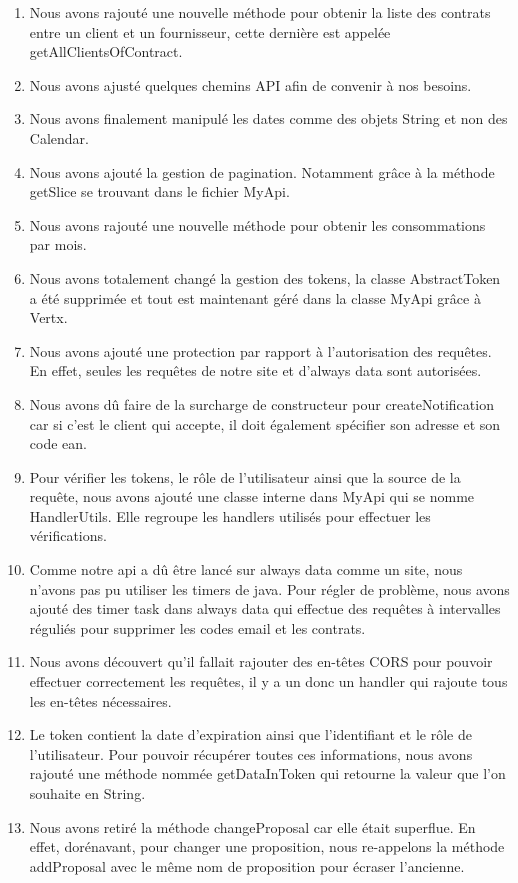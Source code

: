 \begin{enumerate}
\item Nous avons rajouté une nouvelle méthode pour obtenir la liste des contrats entre un client et un fournisseur, cette dernière est appelée getAllClientsOfContract.
\item Nous avons ajusté quelques chemins API afin de convenir à nos besoins.
\item Nous avons finalement manipulé les dates comme des objets String et non des Calendar.
\item Nous avons ajouté la gestion de pagination. Notamment grâce à la méthode getSlice se trouvant dans le fichier MyApi.
\item Nous avons rajouté une nouvelle méthode pour obtenir les consommations par mois.
\item Nous avons totalement changé la gestion des tokens, la classe AbstractToken a été supprimée et tout est maintenant géré dans la classe MyApi grâce à Vertx.
\item Nous avons ajouté une protection par rapport à l'autorisation des requêtes. En effet, seules les requêtes de notre site et d'always data sont autorisées.
\item Nous avons dû faire de la surcharge de constructeur pour createNotification car si c'est le client qui accepte, il doit également spécifier son adresse et son code ean.
\item Pour vérifier les tokens, le rôle de l'utilisateur ainsi que la source de la requête, nous avons ajouté une classe interne dans MyApi qui se nomme HandlerUtils. Elle regroupe les handlers utilisés pour effectuer les vérifications.
\item Comme notre api a dû être lancé sur always data comme un site, nous n'avons pas pu utiliser les timers de java. Pour régler de problème, nous avons ajouté des timer task dans always data qui effectue des requêtes à intervalles réguliés pour supprimer les codes email et les contrats.
\item Nous avons découvert qu'il fallait rajouter des en-têtes CORS pour pouvoir effectuer correctement les requêtes, il y a un donc un handler qui rajoute tous les en-têtes nécessaires.
\item Le token contient la date d'expiration ainsi que l'identifiant et le rôle de l'utilisateur. Pour pouvoir récupérer toutes ces informations, nous avons rajouté une méthode nommée getDataInToken qui retourne la valeur que l'on souhaite en String.
\item Nous avons retiré la méthode changeProposal car elle était superflue. En effet, dorénavant, pour changer une proposition, nous re-appelons la méthode addProposal avec le même nom de proposition pour écraser l'ancienne.

\end{enumerate}
